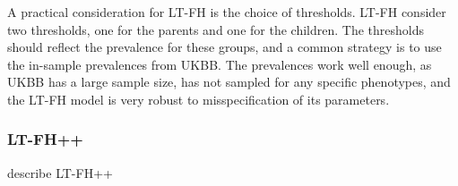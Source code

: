 A practical consideration for LT-FH is the choice of thresholds. LT-FH consider two thresholds, one for the parents and one for the children. The thresholds should reflect the prevalence for these groups, and a common strategy is to use the in-sample prevalences from UKBB. The prevalences work well enough, as UKBB has a large sample size, has not sampled for any specific phenotypes, and the LT-FH model is very robust to misspecification of its parameters.

\subsubsection{LT-FH++}
describe LT-FH++




